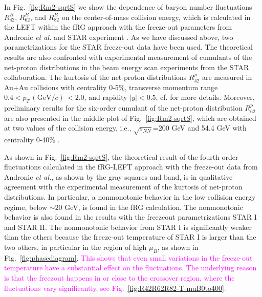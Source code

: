 \documentclass[%
reprint,
superscriptaddress,
showpacs,preprintnumbers,
 amsmath,amssymb,
 aps,
prd,
]{revtex4-1}
\def\Fig#1{Fig.~\ref{#1}} \def\Tab#1{Tab.~\ref{#1}}
\newcommand{\colfab}[1]{\textcolor{magenta}{#1}}
\begin{document}
In \Fig{fig:Rm2-sqrtS} we show the dependence of baryon number fluctuations $R^{B}_{42}$, $R^{B}_{62}$, and $R^{B}_{82}$ on the center-of-mass collision energy, which is calculated in the LEFT within the fRG approach with the freeze-out parameters from Andronic {\it et al.} \cite{Andronic:2017pug} and STAR experiment \cite{Adamczyk:2017iwn}. As we have discussed above, two parametrizations for the STAR freeze-out data have been used. The theoretical results are also confronted with experimental measurement of cumulants of the net-proton distributions in the beam energy scan experiments from the STAR collaboration. The kurtosis of the net-proton distributions $R^{p}_{42}$ are measured in Au+Au collisions with centrality 0-5\%, transverse momentum range $0.4< p_T\,(\mathrm{GeV}/c)\,<2.0$, and rapidity $|y|<0.5$, cf. \cite{Adam:2020unf} for more details. Moreover, preliminary results for the six-order cumulant of the net-proton distribution $R^{p}_{62}$ are also presented in the middle plot of \Fig{fig:Rm2-sqrtS}, which are obtained at two values of the collision energy, i.e., $\sqrt{s_{NN}}$=200 GeV and 54.4 GeV with centrality 0-40\% \cite{Nonaka:2020crv,Pandav:2020uzx}. 

As shown in \Fig{fig:Rm2-sqrtS}, the theoretical result of the fourth-order fluctuations calculated in the fRG-LEFT approach with the freeze-out data from Andronic {\it et al.}, as shown by the gray squares and band, is in qualitative agreement with the experimental measurement of the kurtosis of net-proton distributions.  In particular, a nonmonotonic behavior in the low collision energy regime, below $\sim 20$ GeV, is found in the fRG calculation. The nonmonotonic behavior is also found in the results with the freezeout parametrizations STAR I and STAR II. The nonmonotonic behavior from STAR I is significantly weaker than the others because the freeze-out temperature of STAR I is larger than the two others, in particular in the region of high $\mu_B$, as shown in \Fig{fig:phasediagram}. 
\colfab{This shows that even small variations in the freeze-out temperature have a substantial effect on the fluctuations. The underlying reason is that the freezout happens in or close to the crossover region, where the fluctuations vary significantly, see \Fig{fig:R42R62R82-T-muB0to400}.}
\end{document}
